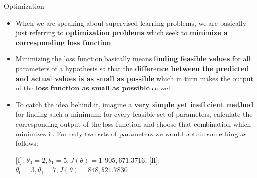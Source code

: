 \documentclass[main.tex]{subfiles}
\begin{document}
	\begin{frame}{Optimization}
		\begin{itemize}
			\item When we are speaking about supervised learning problems, we are basically just referring to \textbf{optimization problems} which seek to \textbf{minimize a corresponding loss function}.
			\item Minimizing the loss function basically means \textbf{finding feasible values} for all parameters of a hypothesis so that the \textbf{difference between the predicted and actual values is as small as possible} which in turn makes the output of the \textbf{loss function as small as possible} as well.
			\item To catch the idea behind it, imagine a \textbf{very simple yet inefficient method} for finding such a minimum: for every feasible set of parameters, calculate the corresponding output of the loss function and choose that combination which minimizes it. For only two sets of parameters we would obtain something as follows:
			\vspace{3mm}
			\begin{table}
				\scalebox{0.8}{}
				\caption*{[I]: $\theta_0 = 2, \theta_1 = 5, J(\theta) = 1{,}905{,}671.3716$, [II]: $\theta_0 = 3, \theta_1 = 7, J(\theta) = 848{,}521.7830$}
			\end{table}
			\vspace{-5mm}
		\end{itemize}
	\end{frame}
\end{document}
